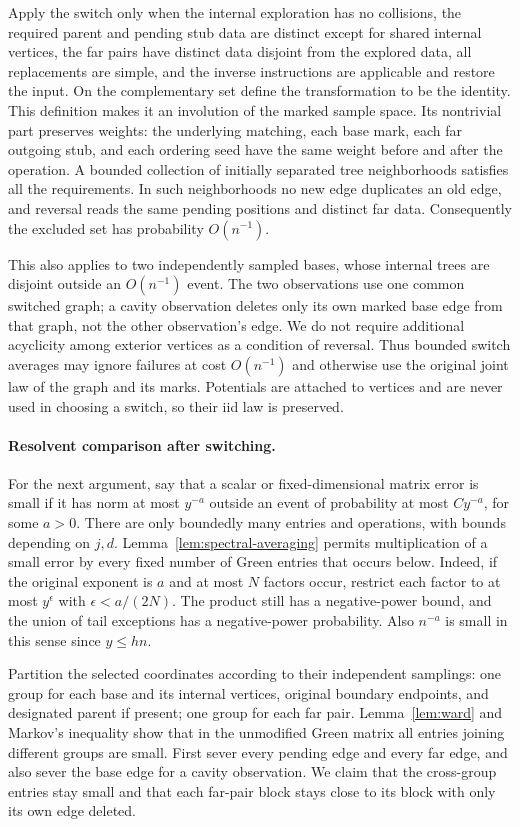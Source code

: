 Apply the switch only when the internal exploration has no collisions,
the required parent and pending stub data are distinct except for shared
internal vertices, the far pairs have distinct data disjoint from the
explored data, all replacements are simple, and the inverse instructions
are applicable and restore the input.  On the complementary set define
the transformation to be the identity.  This definition makes it an
involution of the marked sample space.  Its nontrivial part preserves
weights: the underlying matching, each base mark, each far outgoing
stub, and each ordering seed have the same weight before and after the
operation.  A bounded collection of initially separated tree
neighborhoods satisfies all the requirements.  In such neighborhoods no
new edge duplicates an old edge, and reversal reads the same pending
positions and distinct far data.  Consequently the excluded set has
probability $O(n^{-1})$.

This also applies to two independently sampled bases, whose internal
trees are disjoint outside an $O(n^{-1})$ event.  The two observations
use one common switched graph; a cavity observation deletes only its
own marked base edge from that graph, not the other observation's edge.  We do not require
additional acyclicity among exterior vertices as a condition of
reversal.  Thus bounded switch averages may ignore failures at cost
$O(n^{-1})$ and otherwise use the original joint law of the graph and
its marks.  Potentials are attached to vertices and are never used in
choosing a switch, so their iid law is preserved.

\paragraph{Resolvent comparison after switching.}
For the next argument, say that a scalar or fixed-dimensional matrix
error is small if it has norm at most $y^{-a}$ outside an event of
probability at most $Cy^{-a}$, for some $a>0$.  There are only boundedly
many entries and operations, with bounds depending on $j,d$.
Lemma~\ref{lem:spectral-averaging} permits multiplication of a small
error by every fixed number of Green entries that occurs below.
Indeed, if the original exponent is $a$ and at most $N$ factors occur,
restrict each factor to at most $y^\epsilon$ with
$\epsilon<a/(2N)$.  The product still has a negative-power bound, and
the union of tail exceptions has a negative-power probability.
Also $n^{-a}$ is small in this sense since $y\le hn$.

Partition the selected coordinates according to their independent
samplings: one group for each base and its internal vertices, original
boundary endpoints, and designated parent if present; one group for
each far pair.  Lemma~\ref{lem:ward} and Markov's inequality show that
in the unmodified Green matrix all entries joining different groups
are small.  First sever every pending edge and every far edge, and
also sever the base edge for a cavity observation.  We claim that the
cross-group entries stay small and that each far-pair block stays close
to its block with only its own edge deleted.

